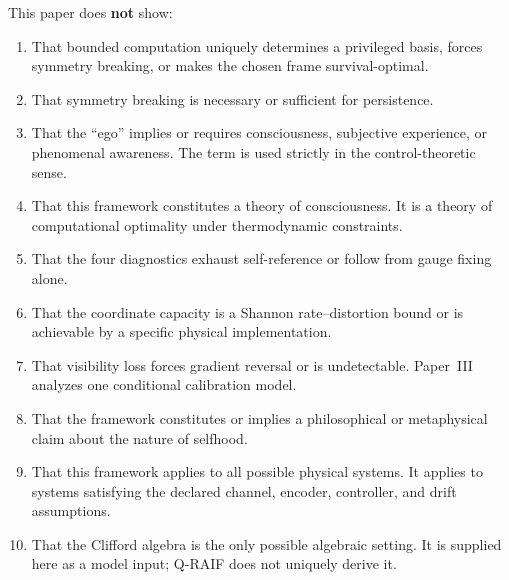 \documentclass[12pt]{article}
\begin{document}
\medskip
This paper does \textbf{not} show:
\begin{enumerate}
\item That bounded computation uniquely determines a privileged basis,
  forces symmetry breaking, or makes the chosen frame survival-optimal.
\item That symmetry breaking is necessary or sufficient for persistence.
\item That the ``ego'' implies or requires consciousness,
  subjective experience, or phenomenal awareness.
  The term is used strictly in the control-theoretic sense.
\item That this framework constitutes a theory of
  consciousness. It is a theory of computational optimality
  under thermodynamic constraints.
\item That the four diagnostics exhaust self-reference or follow from
  gauge fixing alone.
\item That the coordinate capacity is a Shannon rate--distortion bound or
  is achievable by a specific physical implementation.
\item That visibility loss forces gradient reversal or is undetectable.
  Paper~III analyzes one conditional calibration model.
\item That the framework constitutes or implies a
  philosophical or metaphysical claim about the nature
  of selfhood.
\item That this framework applies to all possible physical
  systems. It applies to systems
  satisfying the declared channel, encoder, controller, and drift
  assumptions.
\item That the Clifford algebra is the only possible
  algebraic setting. It is supplied here as a model input; Q-RAIF does
  not uniquely derive it.
\end{enumerate}
\end{document}
